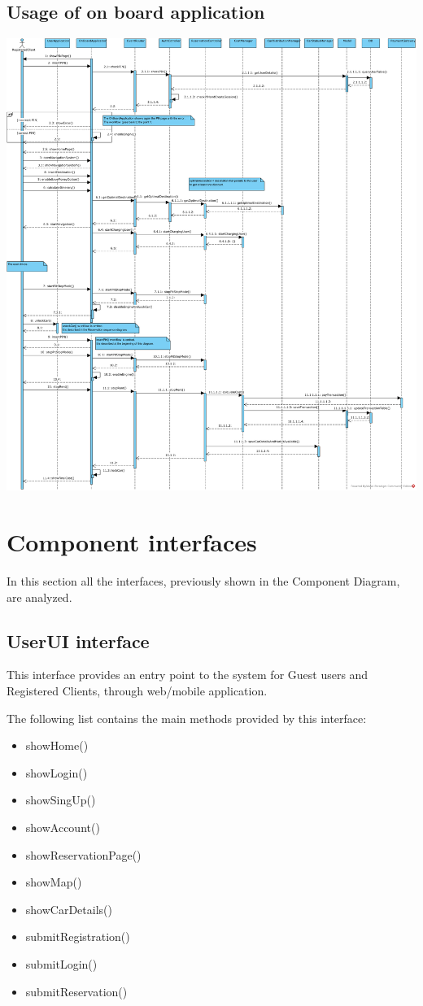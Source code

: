 \subsection{Usage of on board application}
\includegraphics[width=\textwidth, keepaspectratio]{../images/architectural_design/rv_onboard.png}

\section{Component interfaces}
In this section all the interfaces, previously shown in the Component Diagram, are analyzed.

\subsection{UserUI interface}
This interface provides an entry point to the system for Guest users and Registered Clients, through web/mobile application.

The following list contains the main methods provided by this interface:
\begin{itemize}
\item showHome()
\item showLogin()
\item showSingUp()
\item showAccount()
\item showReservationPage()
\item showMap()
\item showCarDetails()
\item submitRegistration()
\item submitLogin()
\item submitReservation()
\end{itemize}

